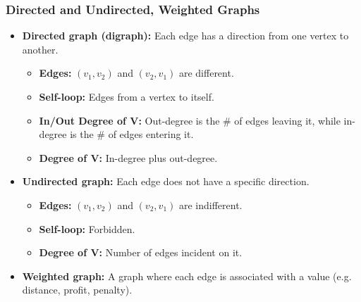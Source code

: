    \subsubsection{Directed and Undirected, Weighted Graphs}
        \begin{definition}
            \begin{itemize}
                \item \textbf{Directed graph (digraph):} Each edge has a direction from one vertex to another. 
                \begin{itemize}
                    \item \textbf{Edges:} $(v_1,v_2)$ and $(v_2,v_1)$ are different.
                    \item \textbf{Self-loop:} Edges from a vertex to itself.
                    \item \textbf{In/Out Degree of V:} Out-degree is the \# of edges leaving it, while in-degree is the \# of edges entering it.
                    \item \textbf{Degree of V:} In-degree plus out-degree.
                \end{itemize}
                \item \textbf{Undirected graph:} Each edge does not have a specific direction.
                \begin{itemize}
                    \item \textbf{Edges:} $(v_1,v_2)$ and $(v_2,v_1)$ are indifferent.
                    \item \textbf{Self-loop:} Forbidden.
                    \item \textbf{Degree of V:} Number of edges incident on it.
                \end{itemize}
                \item \textbf{Weighted graph:} A graph where each edge is associated with a value (e.g. distance, profit, penalty).
            \end{itemize}
        \end{definition}


